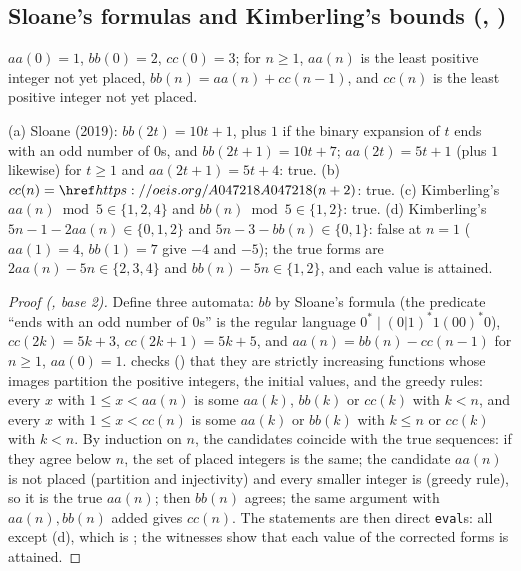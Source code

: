 \subsection{Sloane's formulas and Kimberling's bounds (, )}\label{s:A297469}
$aa(0)=1$, $bb(0)=2$, $cc(0)=3$; for $n\ge1$, $aa(n)$ is the least positive integer not yet placed,
$bb(n)=aa(n)+cc(n-1)$, and $cc(n)$ is the least positive integer not yet placed.
\begin{theorem} (a) Sloane (2019): $bb(2t)=10t+1$, plus $1$ if the binary expansion of $t$ ends with an odd
number of $0$s, and $bb(2t+1)=10t+7$; $aa(2t)=5t+1$ (plus $1$ likewise) for $t\ge1$ and $aa(2t+1)=5t+4$: true.
(b) $cc(n)=\oeis{A047218}(n+2)$: true. (c) Kimberling's $aa(n)\bmod5\in\{1,2,4\}$ and $bb(n)\bmod5\in\{1,2\}$:
true. (d) Kimberling's $5n-1-2aa(n)\in\{0,1,2\}$ and $5n-3-bb(n)\in\{0,1\}$: false at $n=1$ ($aa(1)=4$,
$bb(1)=7$ give $-4$ and $-5$); the true forms are $2aa(n)-5n\in\{2,3,4\}$ and $bb(n)-5n\in\{1,2\}$, and each value is
attained.\end{theorem}
\begin{proof}[Proof (\Walnut, base 2)] Define three automata: $bb$ by Sloane's formula (the predicate ``ends
with an odd number of $0$s'' is the regular language $0^*\mid(0|1)^*1(00)^*0$), $cc(2k)=5k+3$, $cc(2k+1)=5k+5$, and
$aa(n)=bb(n)-cc(n-1)$ for $n\ge1$, $aa(0)=1$. \Walnut{} checks (\TRUE) that they are strictly increasing functions
whose images partition the positive integers, the initial values, and the greedy rules: every $x$ with
$1\le x<aa(n)$ is some $aa(k)$, $bb(k)$ or $cc(k)$ with $k<n$, and every $x$ with $1\le x<cc(n)$ is some $aa(k)$ or
$bb(k)$ with $k\le n$ or $cc(k)$ with $k<n$. By induction on $n$, the candidates coincide with the true sequences:
if they agree below $n$, the set of placed integers is the same; the candidate $aa(n)$ is not placed (partition
and injectivity) and every smaller integer is (greedy rule), so it is the true $aa(n)$; then $bb(n)$ agrees; the
same argument with $aa(n),bb(n)$ added gives $cc(n)$. The statements are then direct \texttt{eval}s: all \TRUE{}
except (d), which is \FALSE; the witnesses show that each value of the corrected forms is attained. \end{proof}

